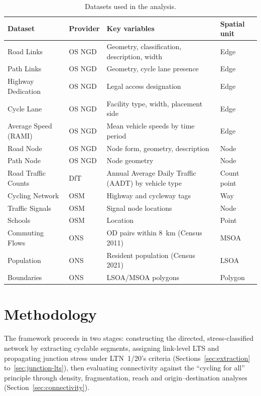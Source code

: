 \documentclass[final,5p,times,twocolumn,authoryear]{elsarticle}
\begin{document}
\begin{table}[!t]
\centering
\caption{Datasets used in the analysis.}
\label{tab:datasets}
\small
\begin{tabularx}{\textwidth}{Z{0.85} Z{0.6} Z{1.9} Z{0.65}}
\toprule
Dataset & Provider & Key variables & Spatial unit \\
\midrule
Road Links & OS NGD & Geometry, classification, description, width & Edge \\
Path Links & OS NGD & Geometry, cycle lane presence & Edge \\
Highway Dedication & OS NGD & Legal access designation & Edge \\
Cycle Lane & OS NGD & Facility type, width, placement side & Edge \\
Average Speed (RAMI) & OS NGD & Mean vehicle speeds by time period & Edge \\
Road Node & OS NGD & Node form, geometry, description & Node \\
Path Node & OS NGD & Node geometry & Node \\
Road Traffic Counts & DfT & Annual Average Daily Traffic (AADT) by vehicle type & Count point \\
Cycling Network & OSM & Highway and cycleway tags & Way \\
Traffic Signals & OSM & Signal node locations & Node \\
Schools & OSM & Location & Point \\
Commuting Flows & ONS & OD pairs within 8~km (Census 2011) & MSOA \\
Population & ONS & Resident population (Census 2021) & LSOA \\
Boundaries & ONS & LSOA/MSOA polygons & Polygon \\
\bottomrule
\end{tabularx}
\end{table}

\section{Methodology}
\label{sec:methodology}

The framework proceeds in two stages: constructing the directed, stress-classified network by extracting cyclable segments, assigning link-level LTS and propagating junction stress under LTN~1/20's criteria (Sections~\ref{sec:extraction} to~\ref{sec:junction-lts}), then evaluating connectivity against the ``cycling for all'' principle through density, fragmentation, reach and origin--destination analyses (Section~\ref{sec:connectivity}). 
\end{document}
